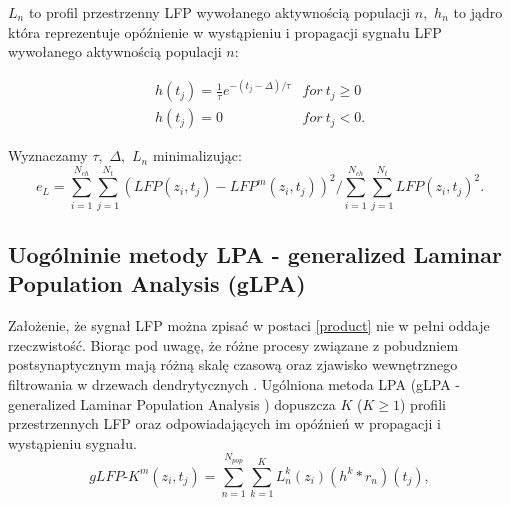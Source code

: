 $L_n$ to profil przestrzenny LFP wywołanego aktywnością populacji $n,$ $h_n$ to jądro która reprezentuje opóźnienie w wystąpieniu i propagacji sygnału LFP wywołanego aktywnością populacji $n:$


\begin{eqnarray}
\label{h_function}
h(t_j) = \frac{1}{\tau}e^{-(t_j - \Delta)/\tau}  &for \ t_j \geq 0\\
h(t_j) = 0 &for \ t_j <0.
\end{eqnarray}

Wyznaczamy $\tau,$ $\Delta,$ $L_n$ minimalizując:
\begin{equation}
e_L = \sum^{N_{ch}}_{i=1}\sum^{N_t}_{j=1} \left( LFP(z_i, t_j) - LFP^m(z_i, t_j) \right)^2/ \sum^{N_{ch}}_{i=1}\sum^{N_t}_{j=1} LFP(z_i, t_j)^2.
\label{LFPerror}
\end{equation}

\subsection{ Uogólninie metody LPA - generalized Laminar Population Analysis (gLPA)}

Założenie, że sygnał LFP można zpisać w postaci \ref{product} nie w pełni oddaje rzeczwistość. Biorąc pod uwagę, że różne procesy związane z pobudzniem postsynaptycznym mają różną skalę czasową oraz zjawisko wewnętrznego filtrowania w drzewach dendrytycznych \cite{Linden2010}.%
Ugólniona metoda LPA (gLPA - generalized Laminar Population Analysis ) dopuszcza $K$ ($K \geq 1$) profili przestrzennych LFP oraz odpowiadających im opóźnień w propagacji i wystąpieniu sygnału. 
\begin{equation}
 gLFP\textrm{-}K^m(z_i, t_j) =  \sum^{N_{pop}}_{n=1} \sum_{k=1}^K L_n^k(z_i)(h^k*r_n)(t_j),
 \label{gLFPdecomposition}
\end{equation}